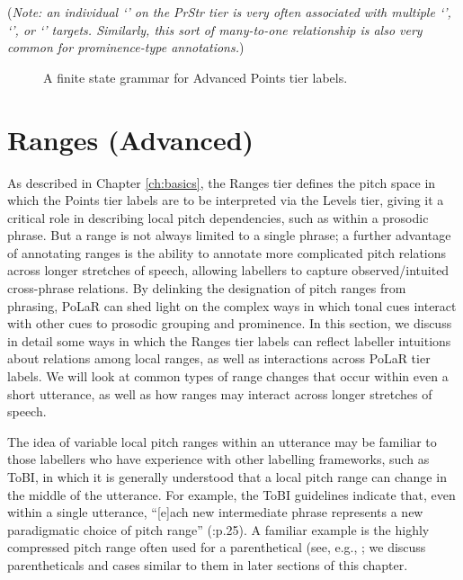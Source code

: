 (\textit{Note: an individual ‘\textlabel{]}’ on the PrStr tier is very often associated with multiple ‘\textlabel{]>}’, ‘\textlabel{]<}’, or ‘\textlabel{]@}’ targets. Similarly, this sort of many-to-one relationship is also very common for prominence-type annotations.})

\begin{figure}[H]
\centering
%

%
\caption{A finite state grammar for Advanced Points tier labels.%
\label{fig:Points FSG complete}%
}
\end{figure}


\section{Ranges (Advanced)}\label{sec:ranges-advanced}

As described in Chapter \ref{ch:basics}, the Ranges tier defines the pitch space in which the Points tier labels are to be interpreted via the Levels tier, giving it a critical role in describing local pitch dependencies, such as within a prosodic phrase. But a range is not always limited to a single phrase; a further advantage of annotating ranges is the ability to annotate more complicated pitch relations across longer stretches of speech, allowing labellers to capture observed\slash intuited cross-phrase relations. By delinking the designation of pitch ranges from phrasing, PoLaR can shed light on the complex ways in which tonal cues interact with other cues to prosodic grouping and prominence. In this section, we discuss in detail some ways in which the Ranges tier labels can reflect labeller intuitions about relations among local ranges, as well as interactions across PoLaR tier labels. We will look at common types of range changes that occur within even a short utterance, as well as how ranges may interact across longer stretches of speech.

The idea of variable local pitch ranges within an utterance may be familiar to those labellers who have experience with other labelling frameworks, such as ToBI, in which it is generally understood that a local pitch range can change in the middle of the utterance. For example, the ToBI guidelines indicate that, even within a single utterance, “[e]ach new intermediate phrase represents a new paradigmatic choice of pitch range” (\citealt{beckmanayers97}:p.25). A familiar example is the highly compressed pitch range often used for a parenthetical (see, e.g., \citealt{dehewichmann10}; we discuss parentheticals and cases similar to them in later sections of this chapter.

